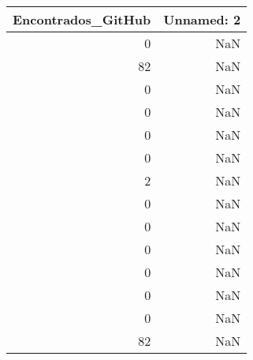 \begin{tabular}{rr}
\toprule
 Encontrados\_GitHub &  Unnamed: 2 \\
\midrule
                  0 &         NaN \\
                 82 &         NaN \\
                  0 &         NaN \\
                  0 &         NaN \\
                  0 &         NaN \\
                  0 &         NaN \\
                  2 &         NaN \\
                  0 &         NaN \\
                  0 &         NaN \\
                  0 &         NaN \\
                  0 &         NaN \\
                  0 &         NaN \\
                  0 &         NaN \\
                 82 &         NaN \\
\bottomrule
\end{tabular}

